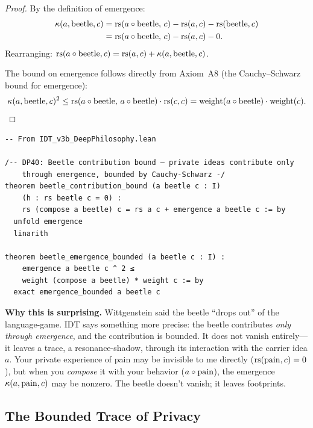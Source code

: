 \begin{proof}
By the definition of emergence:
\begin{align*}
\kappa(a, \mathrm{beetle}, c)
&= \mathrm{rs}(a \circ \mathrm{beetle},\, c) - \mathrm{rs}(a, c) - \mathrm{rs}(\mathrm{beetle}, c) \\
&= \mathrm{rs}(a \circ \mathrm{beetle},\, c) - \mathrm{rs}(a, c) - 0.
\end{align*}
Rearranging: $\mathrm{rs}(a \circ \mathrm{beetle}, c) = \mathrm{rs}(a, c) +
\kappa(a, \mathrm{beetle}, c)$.

The bound on emergence follows directly from Axiom~A8 (the Cauchy--Schwarz
bound for emergence):
\[
\kappa(a, \mathrm{beetle}, c)^2
\leq \mathrm{rs}(a \circ \mathrm{beetle},\, a \circ \mathrm{beetle})
     \cdot \mathrm{rs}(c, c)
= \mathrm{weight}(a \circ \mathrm{beetle}) \cdot \mathrm{weight}(c).
\]
\end{proof}

\begin{lstlisting}
-- From IDT_v3b_DeepPhilosophy.lean

/-- DP40: Beetle contribution bound — private ideas contribute only
    through emergence, bounded by Cauchy-Schwarz -/
theorem beetle_contribution_bound (a beetle c : I)
    (h : rs beetle c = 0) :
    rs (compose a beetle) c = rs a c + emergence a beetle c := by
  unfold emergence
  linarith

theorem beetle_emergence_bounded (a beetle c : I) :
    emergence a beetle c ^ 2 ≤
    weight (compose a beetle) * weight c := by
  exact emergence_bounded a beetle c
\end{lstlisting}

\begin{surprisebox}
\noindent\textbf{Why this is surprising.}
Wittgenstein said the beetle ``drops out'' of the language-game.  IDT says
something more precise: the beetle contributes \emph{only through emergence},
and the contribution is bounded.  It does not vanish entirely---it leaves a
trace, a resonance-shadow, through its interaction with the carrier idea $a$.
Your private experience of pain may be invisible to me directly
($\mathrm{rs}(\mathrm{pain}, c) = 0$), but when you \emph{compose} it with your
behavior ($a \circ \mathrm{pain}$), the emergence $\kappa(a,
\mathrm{pain}, c)$ may be nonzero.  The beetle doesn't vanish; it leaves
footprints.
\end{surprisebox}

\subsection{The Bounded Trace of Privacy}


